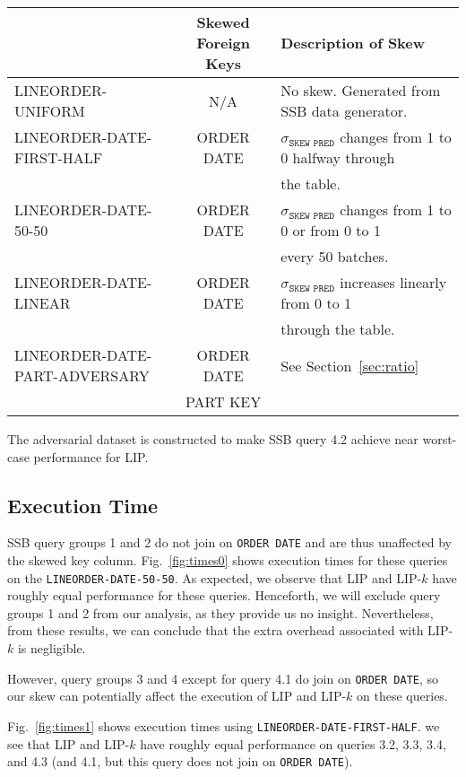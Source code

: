 \begin{center}
\begin{tabular}{ |>{\ttfamily}l|>{\ttfamily}c|l| } 
\hline
{\bf Dataset Name} & {\bf Skewed Foreign Keys} & {\bf Description of Skew} \\
\hline
\hline
LINEORDER-UNIFORM& N/A & No skew. Generated from SSB data generator.\\
\hline
LINEORDER-DATE-FIRST-HALF& ORDER DATE & $\sigma_{\texttt{SKEW PRED}}$ changes from 1 to 0 halfway through\\
& &  the table.\\
\hline
LINEORDER-DATE-50-50& ORDER DATE & $\sigma_{\texttt{SKEW PRED}}$ changes from 1 to 0 or from 0 to 1 \\
& & every 50 batches. \\ 
\hline
LINEORDER-DATE-LINEAR& ORDER DATE & $\sigma_{\texttt{SKEW PRED}}$ increases linearly from 0 to 1 \\
& & through the table. \\
\hline
LINEORDER-DATE-PART-ADVERSARY& ORDER DATE & See Section~\ref{sec:ratio}\\
& PART KEY & \\
\hline
\end{tabular}
\end{center}

The adversarial dataset is constructed to make SSB query 4.2 achieve near worst-case performance for LIP. 


\subsection{Execution Time}
\label{sec:time}



SSB query groups 1 and 2 do not join on \texttt{ORDER DATE} and are thus unaffected by the skewed key column. 
Fig.~\ref{fig:times0} shows execution times for these queries on the \texttt{LINEORDER-DATE-50-50}.
As expected, we observe that LIP and LIP-$k$ have roughly equal performance for these queries.
Henceforth, we will exclude query groups 1 and 2 from our analysis, 
as they provide us no insight. 
Nevertheless, from these results, we can conclude that the extra overhead associated with LIP-$k$ is negligible.

However, query groups 3 and 4 except for query 4.1 do join on \texttt{ORDER DATE}, so our skew can potentially affect the execution of LIP and LIP-$k$ on these queries.

Fig.~\ref{fig:times1} shows execution times using \texttt{LINEORDER-DATE-FIRST-HALF}. we see that LIP and LIP-$k$ have roughly equal performance on queries 3.2, 3.3, 3.4, and 4.3 
(and 4.1, but this query does not join on \texttt{ORDER DATE}).


